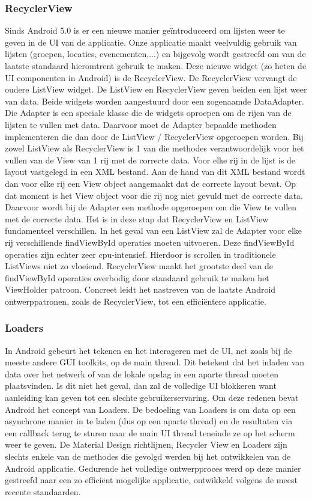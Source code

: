 \subsubsection{RecyclerView}
Sinds Android 5.0 is er een nieuwe manier geïntroduceerd om lijsten weer te geven in de UI van de applicatie. Onze applicatie maakt veelvuldig gebruik van lijsten (groepen, locaties, evenementen,...) en bijgevolg wordt gestreefd om van de laatste standaard hieromtrent gebruik te maken. Deze nieuwe widget (zo heten de UI componenten in Android) is de RecyclerView. De RecyclerView vervangt de oudere ListView widget.
De ListView en RecyclerView geven beiden een lijst weer van data. Beide widgets worden aangestuurd door een zogenaamde DataAdapter. Die Adapter is een speciale klasse die de widgets oproepen om de rijen van de lijsten te vullen met data. Daarvoor moet de Adapter bepaalde methoden implementeren die dan door de ListView / RecyclerView opgeroepen worden. Bij zowel ListView als RecyclerView is 1 van die methodes verantwoordelijk voor het vullen van de View van 1 rij met de correcte data.
Voor elke rij in de lijst is de layout vastgelegd in een XML bestand. Aan de hand van dit XML bestand wordt dan voor elke rij een View object aangemaakt dat de correcte layout bevat. Op dat moment is het View object voor die rij nog niet gevuld met de correcte data. Daarvoor wordt bij de Adapter een methode opgeroepen om die View te vullen met de correcte data.
Het is in deze stap dat RecyclerView en ListView fundamenteel verschillen. In het geval van een ListView zal de Adapter voor elke rij verschillende findViewById operaties moeten uitvoeren. Deze findViewById operaties zijn echter zeer cpu-intensief. Hierdoor is scrollen in traditionele ListViews niet zo vloeiend.
RecyclerView maakt het grootste deel van de findViewById operaties overbodig door standaard gebruik te maken het ViewHolder patroon.
Concreet leidt het nastreven van de laatste Android ontwerppatronen, zoals de RecyclerView, tot een efficiëntere applicatie.

\subsubsection{Loaders}
In Android gebeurt het tekenen en het interageren met de UI, net zoals bij de meeste andere GUI toolkits, op de main thread. Dit betekent dat het inladen van data over het netwerk of van de lokale opslag in een aparte thread moeten plaatsvinden. Is dit niet het geval, dan zal de volledige UI blokkeren want aanleiding kan geven tot een slechte gebruikerservaring.
Om deze redenen bevat Android het concept van Loaders. De bedoeling van Loaders is om data op een asynchrone manier in te laden (dus op een aparte thread) en de resultaten via een callback terug te sturen naar de main UI thread teneinde ze op het scherm weer te geven. 
\newline\newline
De Material Design richtlijnen, Recycler View en Loaders zijn slechts enkele van de methodes die gevolgd werden bij het ontwikkelen van de Android applicatie. Gedurende het volledige ontwerpproces werd op deze manier gestreefd naar een zo efficiënt mogelijke applicatie, ontwikkeld volgens de meest recente standaarden. \cite{successapp}
